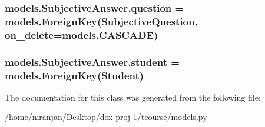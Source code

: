 \subsubsection[{\texorpdfstring{question}{question}}]{\setlength{\rightskip}{0pt plus 5cm}models.\+Subjective\+Answer.\+question = models.\+Foreign\+Key({\bf Subjective\+Question}, on\+\_\+delete=models.\+C\+A\+S\+C\+A\+DE)\hspace{0.3cm}{\ttfamily [static]}}\hypertarget{classmodels_1_1_subjective_answer_af9a597711020be40904098d109899fb9}{}\label{classmodels_1_1_subjective_answer_af9a597711020be40904098d109899fb9}
\subsubsection[{\texorpdfstring{student}{student}}]{\setlength{\rightskip}{0pt plus 5cm}models.\+Subjective\+Answer.\+student = models.\+Foreign\+Key({\bf Student})\hspace{0.3cm}{\ttfamily [static]}}\hypertarget{classmodels_1_1_subjective_answer_a49878151c4b245be46cccbf3eebd7769}{}\label{classmodels_1_1_subjective_answer_a49878151c4b245be46cccbf3eebd7769}


The documentation for this class was generated from the following file\+:\begin{DoxyCompactItemize}
\item 
/home/niranjan/\+Desktop/dox-\/proj-\/1/tcourse/\hyperlink{models_8py}{models.\+py}\end{DoxyCompactItemize}
